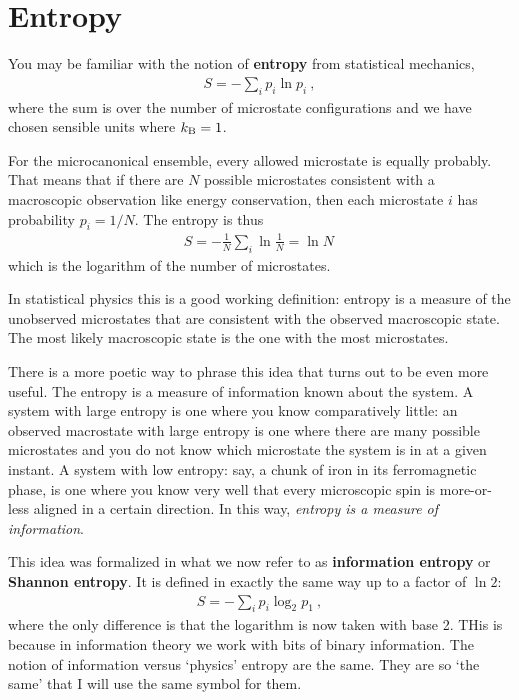 \documentclass[12pt, oneside]{report}
\let\oldsection\section
\def\section{%
  \setcounter{sidenote}{1}%
  \oldsection
}
\begin{document}
  \section{Entropy} 

  You may be familiar with the notion of \textbf{entropy} from statistical mechanics,
  \begin{align}
    S = -\sum_i p_i \ln p_i \ ,
  \end{align}
  where the sum is over the number of microstate configurations and we have chosen sensible units where $k_\textnormal{B} =1$. 
  \begin{example}
  For the microcanonical ensemble, every allowed microstate is equally probably. That means that if there are $N$ possible microstates consistent with a macroscopic observation like energy conservation, then each microstate $i$ has probability $p_i = 1/N$. The entropy is thus
  \begin{align}
    S = -\frac{1}{N}\sum_i \ln \frac{1}{N} = \ln N \,
  \end{align}
  which is the logarithm of the number of microstates.
  \end{example}
  In statistical physics this is a good working definition: entropy is a measure of the unobserved microstates that are consistent with the observed macroscopic state. The most likely macroscopic state is the one with the most microstates. 

  There is a more poetic way to phrase this idea that turns out to be even more useful. The entropy is a measure of information known about the system. A system with large entropy is one where you know comparatively little: an observed macrostate with large entropy is one where there are many possible microstates and you do not know which microstate the system is in at a given instant. A system with low entropy: say, a chunk of iron in its ferromagnetic phase, is one where you know very well that every microscopic spin is more-or-less aligned in a certain direction. In this way, \emph{entropy is a measure of information}.

  This idea was formalized in what we now refer to as \textbf{information entropy} or \textbf{Shannon entropy}. It is defined in exactly the same way up to a factor of $\ln 2$:
  \begin{align}
    S = -\sum_i p_i \log_2 p_1 \ ,
  \end{align}
  where the only difference is that the logarithm is now taken with base 2. THis is because in information theory we work with bits of binary information. The notion of information versus `physics' entropy are the same. They are so `the same' that I will use the same symbol for them. 
\end{document}
